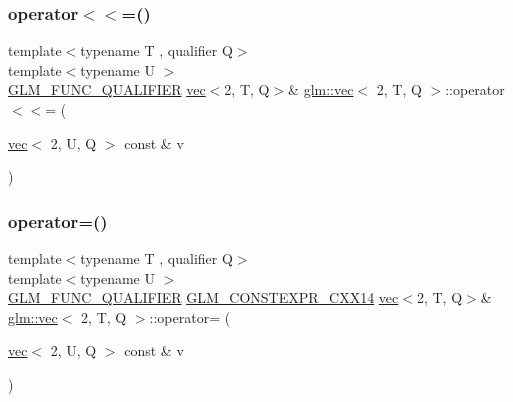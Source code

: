 \mbox{\label{structglm_1_1vec_3_012_00_01_t_00_01_q_01_4_a3bbdd09fd3976b858078dc1157cecf19}} 
\subsubsection{\texorpdfstring{operator$<$$<$=()}{operator<<=()}\hspace{0.1cm}{\footnotesize\ttfamily [6/6]}}
{\footnotesize\ttfamily template$<$typename T , qualifier Q$>$ \\
template$<$typename U $>$ \\
\hyperlink{setup_8hpp_a33fdea6f91c5f834105f7415e2a64407}{G\+L\+M\+\_\+\+F\+U\+N\+C\+\_\+\+Q\+U\+A\+L\+I\+F\+I\+ER} \hyperlink{structglm_1_1vec}{vec}$<$2, T, Q$>$\& \hyperlink{structglm_1_1vec}{glm\+::vec}$<$ 2, T, Q $>$\+::operator$<$$<$= (\begin{DoxyParamCaption}\item[{\hyperlink{structglm_1_1vec}{vec}$<$ 2, U, Q $>$ const \&}]{v }\end{DoxyParamCaption})}

\mbox{\label{structglm_1_1vec_3_012_00_01_t_00_01_q_01_4_a9bd00e17d1fda738c0e07b652e39e7f6}} 
\subsubsection{\texorpdfstring{operator=()}{operator=()}\hspace{0.1cm}{\footnotesize\ttfamily [1/3]}}
{\footnotesize\ttfamily template$<$typename T , qualifier Q$>$ \\
template$<$typename U $>$ \\
\hyperlink{setup_8hpp_a33fdea6f91c5f834105f7415e2a64407}{G\+L\+M\+\_\+\+F\+U\+N\+C\+\_\+\+Q\+U\+A\+L\+I\+F\+I\+ER} \hyperlink{setup_8hpp_a4dd12abf5e1164bc57f3a34671d03844}{G\+L\+M\+\_\+\+C\+O\+N\+S\+T\+E\+X\+P\+R\+\_\+\+C\+X\+X14} \hyperlink{structglm_1_1vec}{vec}$<$2, T, Q$>$\& \hyperlink{structglm_1_1vec}{glm\+::vec}$<$ 2, T, Q $>$\+::operator= (\begin{DoxyParamCaption}\item[{\hyperlink{structglm_1_1vec}{vec}$<$ 2, U, Q $>$ const \&}]{v }\end{DoxyParamCaption})}



